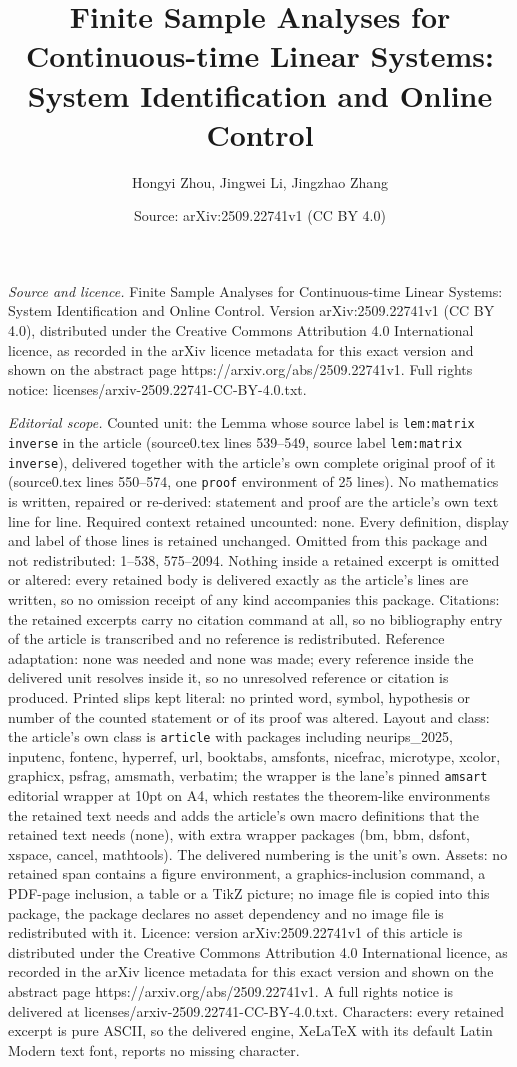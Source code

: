 \documentclass[10pt,a4paper]{amsart}
\title[Finite Sample Analyses for Continuous-time Linear Systems: S]{Finite Sample Analyses for Continuous-time Linear Systems: System Identification and Online Control}
\author{Hongyi Zhou, Jingwei Li, Jingzhao Zhang}
\date{Source: arXiv:2509.22741v1 (CC BY 4.0)}
\begin{document}
\maketitle

\noindent\emph{Source and licence.} Finite Sample Analyses for Continuous-time Linear Systems: System Identification and Online Control. Version arXiv:2509.22741v1 (CC BY 4.0), distributed under the Creative Commons Attribution 4.0 International licence, as recorded in the arXiv licence metadata for this exact version and shown on the abstract page https://arxiv.org/abs/2509.22741v1. Full rights notice: licenses/arxiv-2509.22741-CC-BY-4.0.txt.\par\smallskip

\noindent\textit{Editorial scope.} Counted unit: the Lemma whose source label is \texttt{lem:matrix inverse} in the article (source0.tex lines 539--549, source label \texttt{lem:matrix inverse}), delivered together with the article's own complete original proof of it (source0.tex lines 550--574, one \texttt{proof} environment of 25 lines). No mathematics is written, repaired or re-derived: statement and proof are the article's own text line for line. Required context retained uncounted: none. Every definition, display and label of those lines is retained unchanged. Omitted from this package and not redistributed: 1--538, 575--2094. Nothing inside a retained excerpt is omitted or altered: every retained body is delivered exactly as the article's lines are written, so no omission receipt of any kind accompanies this package. Citations: the retained excerpts carry no citation command at all, so no bibliography entry of the article is transcribed and no reference is redistributed. Reference adaptation: none was needed and none was made; every reference inside the delivered unit resolves inside it, so no unresolved reference or citation is produced. Printed slips kept literal: no printed word, symbol, hypothesis or number of the counted statement or of its proof was altered. Layout and class: the article's own class is \texttt{article} with packages including neurips\_2025, inputenc, fontenc, hyperref, url, booktabs, amsfonts, nicefrac, microtype, xcolor, graphicx, psfrag, amsmath, verbatim; the wrapper is the lane's pinned \texttt{amsart} editorial wrapper at 10pt on A4, which restates the theorem-like environments the retained text needs and adds the article's own macro definitions that the retained text needs (none), with extra wrapper packages (bm, bbm, dsfont, xspace, cancel, mathtools). The delivered numbering is the unit's own. Assets: no retained span contains a figure environment, a graphics-inclusion command, a PDF-page inclusion, a table or a TikZ picture; no image file is copied into this package, the package declares no asset dependency and no image file is redistributed with it. Licence: version arXiv:2509.22741v1 of this article is distributed under the Creative Commons Attribution 4.0 International licence, as recorded in the arXiv licence metadata for this exact version and shown on the abstract page https://arxiv.org/abs/2509.22741v1. A full rights notice is delivered at licenses/arxiv-2509.22741-CC-BY-4.0.txt. Characters: every retained excerpt is pure ASCII, so the delivered engine, XeLaTeX with its default Latin Modern text font, reports no missing character.
\end{document}
